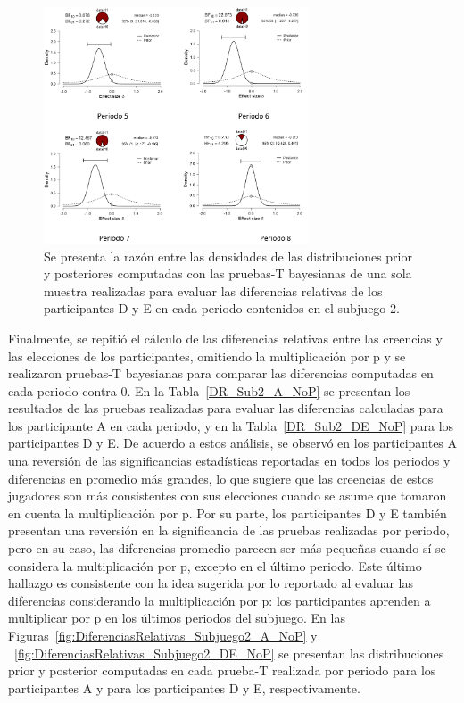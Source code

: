 \begin{figure}[th]
\centering
\includegraphics[width=0.70\textwidth]{Figures/Fig_14} 
\caption[Cambio en el número elegido periodo a periodo.]{Se presenta la razón entre las densidades de las distribuciones prior y posteriores  computadas con las pruebas-T bayesianas de una sola muestra realizadas para evaluar las diferencias relativas de los participantes D y E en cada periodo contenidos en el subjuego 2.}
\label{fig:DiferenciasRelativas_Subjuego2_DE}
\end{figure}

Finalmente, se repitió el cálculo de las diferencias relativas entre las creencias y las elecciones de los participantes, omitiendo la multiplicación por p y se realizaron pruebas-T bayesianas para comparar las diferencias computadas en cada periodo contra 0. En la Tabla~\ref{DR_Sub2_A_NoP} se presentan los resultados de las pruebas realizadas para evaluar las diferencias calculadas para los participante A en cada periodo, y en la Tabla~\ref{DR_Sub2_DE_NoP} para los participantes D y E. De acuerdo a estos análisis, se observó  en los participantes A una reversión de las significancias estadísticas reportadas en todos los periodos y diferencias en promedio más grandes, lo que sugiere que las creencias de estos jugadores son más consistentes con sus elecciones cuando se asume que tomaron en cuenta la multiplicación por p. Por su parte, los participantes D y E también presentan una reversión en la significancia de las pruebas realizadas por periodo, pero en su caso, las diferencias promedio parecen ser más pequeñas cuando sí se considera la multiplicación por p, excepto en el último periodo. Este último hallazgo es consistente con la idea sugerida por lo reportado al evaluar las diferencias considerando la multiplicación por p: los participantes aprenden a multiplicar por p en los últimos periodos del subjuego. En las Figuras~\ref{fig:DiferenciasRelativas_Subjuego2_A_NoP} y ~\ref{fig:DiferenciasRelativas_Subjuego2_DE_NoP} se presentan las distribuciones prior y posterior computadas en cada prueba-T realizada por periodo para los  participantes A y para los participantes D y E, respectivamente.\\


